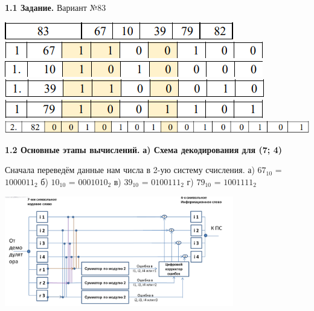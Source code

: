 	\newpage
	\begin{flushleft}
		\textbf{\LARGE 1.1 Задание.}
		\linebreak
		\LARGE Вариант №83
		\linebreak
		
		\includegraphics{screen1}
		\includegraphics{screen2}
		\includegraphics{screen3}
		\includegraphics{screen4}
		\includegraphics{screen5}
		\includegraphics{screen6}
		
	\end{flushleft}

	\newpage
	\begin{flushleft}
		\textbf{\LARGE 1.2 Основные этапы вычислений.}
		\linebreak
		\textbf{а) Схема декодирования для (7; 4)}
		\linebreak
		\vspace*{10mm}
		
		\small Сначала переведём данные нам числа в 2-ую систему счисления.
		\linebreak
		\small а) $67_{10}$ = $1000011_{2}$
		\linebreak
		\small б) $10_{10}$ = $0001010_{2}$
		\linebreak
		\small в) $39_{10}$ = $0100111_{2}$
		\linebreak
		\small г) $79_{10}$ = $1001111_{2}$
		\vspace*{10mm}
		
		\includegraphics[width=10cm]{screen7}
		\linebreak
	\end{flushleft}

